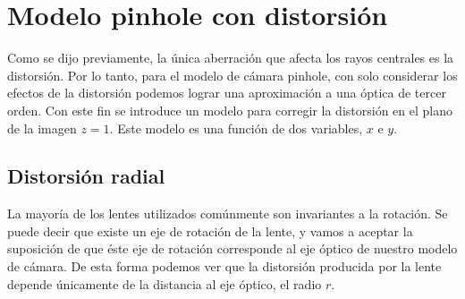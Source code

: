 \section{Modelo pinhole con distorsión}

Como se dijo previamente, la única aberración que afecta los rayos centrales es la distorsión. Por lo tanto, para el modelo de cámara pinhole, con solo considerar los efectos de la distorsión podemos lograr una aproximación a una óptica de tercer orden. Con este fin se introduce un modelo para corregir la distorsión en el plano de la imagen ${z=1}$. Este modelo es una función de dos variables, $x$ e $y$.

\subsection{Distorsión radial}

La mayoría de los lentes utilizados comúnmente son invariantes a la rotación. Se puede decir que existe un eje de rotación de la lente, y vamos a aceptar la suposición de que éste eje de rotación corresponde al eje óptico de nuestro modelo de cámara. De esta forma podemos ver que la distorsión producida por la lente depende únicamente de la distancia al eje óptico, el radio $r$.


